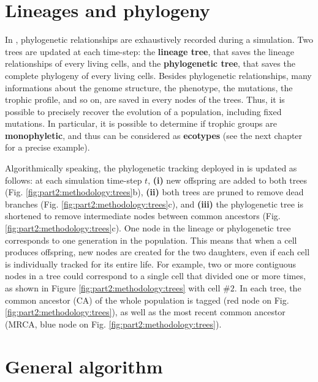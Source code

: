 \section{Lineages and phylogeny}
\label{subsec:part2:methodology:phylogeny}

In {\EvoEvoSim}, phylogenetic relationships are exhaustively recorded during a simulation. Two trees are updated at each time-step: the \textbf{lineage tree}, that saves the lineage relationships of every living cells, and the \textbf{phylogenetic tree}, that saves the complete phylogeny of every living cells. Besides phylogenetic relationships, many informations about the genome structure, the phenotype, the mutations, the trophic profile, and so on, are saved in every nodes of the trees. Thus, it is possible to precisely recover the evolution of a population, including fixed mutations. In particular, it is possible to determine if trophic groups are \textbf{monophyletic}, and thus can be considered as \textbf{ecotypes} (see the next chapter for a precise example).

Algorithmically speaking, the phylogenetic tracking deployed in {\EvoEvoSim} is updated as follows: at each simulation time-step $t$, \textbf{(i)} new offspring are added to both trees (Fig. \ref{fig:part2:methodology:trees}b), \textbf{(ii)} both trees are pruned to remove dead branches (Fig. \ref{fig:part2:methodology:trees}c), and \textbf{(iii)} the phylogenetic tree is shortened to remove intermediate nodes between common ancestors (Fig. \ref{fig:part2:methodology:trees}c). One node in the lineage or phylogenetic tree corresponds to one generation in the population. This means that when a cell produces offspring, new nodes are created for the two daughters, even if each cell is individually tracked for its entire life. For example, two or more contiguous nodes in a tree could correspond to a single cell that divided one or more times, as shown in Figure \ref{fig:part2:methodology:trees} with cell $\#2$. In each tree, the common ancestor (CA) of the whole population is tagged (red node on Fig. \ref{fig:part2:methodology:trees}), as well as the most recent common ancestor (MRCA, blue node on Fig. \ref{fig:part2:methodology:trees}).


\section{General algorithm}
\label{sec:part2:methodology:general_algorithm}

